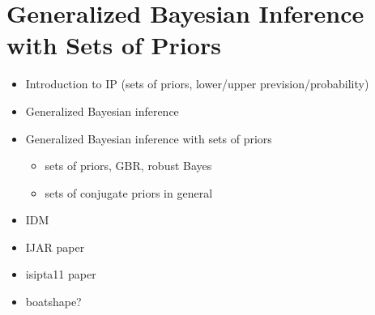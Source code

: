 \chapter{Generalized Bayesian Inference with Sets of Priors}

\begin{itemize}
\item Introduction to IP (sets of priors, lower/upper prevision/probability)
\item Generalized Bayesian inference
\item Generalized Bayesian inference with sets of priors
 \begin{itemize}
 \item sets of priors, GBR, robust Bayes
 \item sets of conjugate priors in general
 \end{itemize}
\item IDM
\item IJAR paper \cite{Walter2009a}
\item isipta11 paper \cite{Walter2011a}
\item boatshape?
\end{itemize}